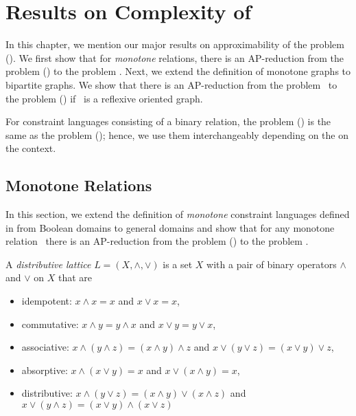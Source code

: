 \chapter{Results on Complexity of \cbis} \label{chp:results}
In this chapter, we mention our major results on approximability
of the problem \ccsp(\mrelset). We first show that for \emph{monotone} relations, there is an
AP-reduction from the problem \ccsp(\mrelset) to the problem \cbis\@.
Next, we extend the definition of monotone graphs to bipartite graphs. 
We show that there is an AP-reduction from the problem \cbis\
to the problem \chom(\mH) if \mH\ is a reflexive oriented graph.

For constraint languages consisting of a binary relation, the problem \ccsp(\mrelset) is
the same as the problem \chom(\mH); hence, we use them interchangeably depending on the on the context.

\section{Monotone Relations}
In this section, we extend the definition of \emph{monotone} constraint languages defined in
\cite{Trichotomy} from Boolean domains to general domains and show that for
any monotone relation \mrelset\ there is an AP-reduction from the problem \ccsp(\mrelset) to
the problem \cbis\@.

\begin{defi} 
A \emph{distributive lattice} \(L=(X,\wedge,\vee)\) is a set \(X\) with a pair of binary operators \(\wedge\)
and \(\vee\) on \(X\) that are 
\begin{itemize}
\item idempotent: \(x \wedge x = x\) and \(x \vee x = x\),
\item commutative: \(x \wedge y = y \wedge x\) and \(x \vee y = y \vee x\),
\item associative: \(x \wedge (y \wedge z) = (x \wedge y) \wedge z\) and 
\(x \vee (y \vee z) = (x \vee y) \vee z\),
\item absorptive: \(x \wedge (x\vee y) = x\) and \(x \vee (x \wedge y) = x\),
\item distributive: \(x \wedge (y \vee z) = (x \wedge y) \vee (x \wedge z)\) and
\(x \vee (y \wedge z) = (x \vee y) \wedge (x \vee z)\)
\end{itemize}
\end{defi}

